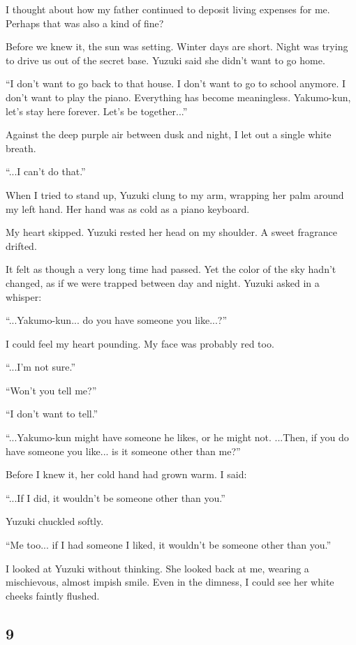 \documentclass[
    a4paper,
    12pt,
    twoside,
    openany,
    UTF8,
    fontset=windows
]{ctexbook}
\begin{document}
I thought about how my father continued to deposit living expenses for me. Perhaps that was also a kind of fine?

Before we knew it, the sun was setting. Winter days are short. Night was trying to drive us out of the secret base. Yuzuki said she didn't want to go home.

``I don't want to go back to that house. I don't want to go to school anymore. I don't want to play the piano. Everything has become meaningless. Yakumo-kun, let's stay here forever. Let's be together...''

Against the deep purple air between dusk and night, I let out a single white breath.

``...I can't do that.''

When I tried to stand up, Yuzuki clung to my arm, wrapping her palm around my left hand. Her hand was as cold as a piano keyboard.

My heart skipped. Yuzuki rested her head on my shoulder. A sweet fragrance drifted.

It felt as though a very long time had passed. Yet the color of the sky hadn't changed, as if we were trapped between day and night. Yuzuki asked in a whisper:

``...Yakumo-kun... do you have someone you like...?''

I could feel my heart pounding. My face was probably red too.

``...I'm not sure.''

``Won't you tell me?''

``I don't want to tell.''

``...Yakumo-kun might have someone he likes, or he might not. ...Then, if you do have someone you like... is it someone other than me?''

Before I knew it, her cold hand had grown warm. I said:

``...If I did, it wouldn't be someone other than you.''

Yuzuki chuckled softly.

``Me too... if I had someone I liked, it wouldn't be someone other than you.''

I looked at Yuzuki without thinking. She looked back at me, wearing a mischievous, almost impish smile. Even in the dimness, I could see her white cheeks faintly flushed.


\subsection*{9}
\end{document}
